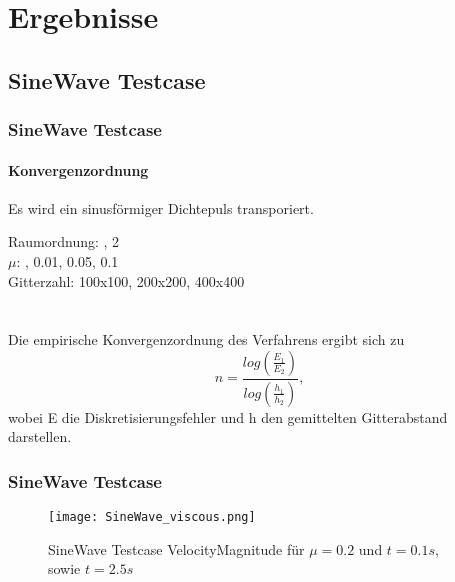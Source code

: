 \documentclass[
	11pt, %
	aspectratio=169, %
]{beamer}
\begin{document}
\section{Ergebnisse}

\subsection{SineWave Testcase}


\begin{frame}
	\frametitle{SineWave Testcase}
	\framesubtitle{Konvergenzordnung}
	Es wird ein sinusförmiger Dichtepuls transporiert.
	\newline

	
Raumordnung: , 2\\
$\mu$: \quad \quad \quad \quad \quad \quad {}, 0.01, 0.05, 0.1\\
Gitterzahl: \quad \quad \quad 100x100, 200x200, 400x400\\ \\ \\
Die empirische Konvergenzordnung des Verfahrens ergibt sich zu
$$n=\frac{log(\frac{E_1}{E_2})}{log(\frac{h_1}{h_2})},$$
wobei E die Diskretisierungsfehler und h den gemittelten Gitterabstand darstellen.
%
\end{frame}




\begin{frame}
	\frametitle{SineWave Testcase}

	\begin{figure}
		\texttt{[image: SineWave\_viscous.png]}
		\caption{SineWave Testcase VelocityMagnitude für $\mu=0.2$ und $t=0.1s$, sowie $t=2.5s$}
	\end{figure}

\end{frame}
\end{document}

